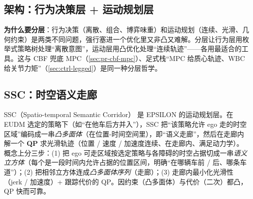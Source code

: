 \subsection{架构：行为决策层 + 运动规划层}
\label{sec:pr-epsilon-arch}

\begin{center}
\small
{}
\end{center}

\textbf{为什么要分层}：行为决策（离散、组合、博弈味重）和运动规划（连续、光滑、几何约束）是两类不同问题，强行塞进一个优化里又非凸又难解。分层让行为层用枚举式策略树处理“离散意图”，运动层用凸优化处理“连续轨迹”——各用最适合的工具。这与 CBF 兜底 MPC（\cref{sec:pr-cbf-mpc}）、足式栈“MPC 给质心轨迹、WBC 给关节力矩”（\cref{sec:ctrl-legged}）是同一种分层哲学。

\subsection{SSC：时空语义走廊}
\label{sec:pr-epsilon-ssc}

SSC（Spatio-temporal Semantic Corridor）\cite{ding2019ssc} 是 EPSILON 的运动规划层。在 EUDM 选定的策略下（如“在他车后方并入”），SSC 把“该策略允许 ego 走的时空区域”编码成一串\emph{凸多面体}（在位置-时间空间里），即“语义走廊”，然后在走廊内解一个 \textbf{QP} 求光滑轨迹（位置 / 速度 / 加速度连续、在走廊内、满足动力学）。概念上分三步：(1) 把 ego 可走区域按选定策略与各障碍的时空占据切成一串\emph{语义立方体}（每个是一段时间内允许占据的位置区间，明确“在哪辆车前 / 后、哪条车道”）；(2) 把相邻立方体连成\emph{凸多面体序列}（走廊）；(3) 走廊内最小化光滑性（jerk / 加速度）+ 跟踪代价的 QP。因约束（凸多面体）与代价（二次）都凸，QP 快而可靠。


